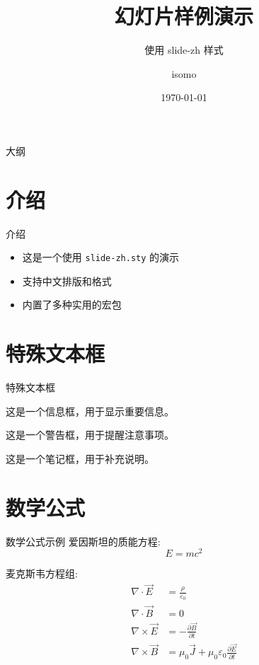 \documentclass{beamer}
\title{幻灯片样例演示}
\subtitle{使用 slide-zh 样式}
\author{isomo}
\date{\today}
\begin{document}
\begin{frame}
  \titlepage
\end{frame}

\begin{frame}{大纲}
  \tableofcontents
\end{frame}

\section{介绍}
\begin{frame}{介绍}
  \begin{itemize}
    \item 这是一个使用 \texttt{slide-zh.sty} 的演示
    \item 支持中文排版和格式
    \item 内置了多种实用的宏包
  \end{itemize}
\end{frame}

\section{特殊文本框}
\begin{frame}{特殊文本框}
  \begin{infobox}
    这是一个信息框，用于显示重要信息。
  \end{infobox}

  \vspace{0.5cm}

  \begin{warningbox}
    这是一个警告框，用于提醒注意事项。
  \end{warningbox}

  \vspace{0.5cm}

  \begin{notebox}
    这是一个笔记框，用于补充说明。
  \end{notebox}
\end{frame}

\section{数学公式}
\begin{frame}{数学公式示例}
  爱因斯坦的质能方程:
  \begin{equation}
    E = mc^2
  \end{equation}

  麦克斯韦方程组:
  \begin{align}
    \nabla \cdot \vec{E} &= \frac{\rho}{\varepsilon_0} \\
    \nabla \cdot \vec{B} &= 0 \\
    \nabla \times \vec{E} &= -\frac{\partial \vec{B}}{\partial t} \\
    \nabla \times \vec{B} &= \mu_0\vec{J} + \mu_0\varepsilon_0\frac{\partial \vec{E}}{\partial t}
  \end{align}
\end{frame}
\end{document}
